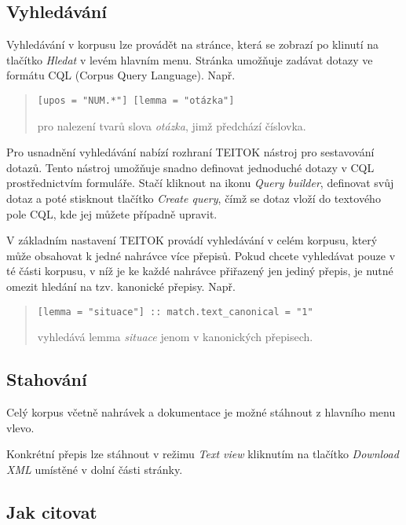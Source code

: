 \documentclass[
]{article}
\begin{document}
\hypertarget{vyhleduxe1vuxe1nuxed}{%
\subsection{Vyhledávání}\label{vyhleduxe1vuxe1nuxed}}

Vyhledávání v korpusu lze provádět na stránce, která se zobrazí po
klinutí na tlačítko \emph{Hledat} v levém hlavním menu. Stránka umožňuje
zadávat dotazy ve formátu CQL (Corpus Query Language). Např.

\begin{quote}
\texttt{{[}upos\ =\ "NUM.*"{]}\ {[}lemma\ =\ "otázka"{]}}

pro nalezení tvarů slova \emph{otázka}, jimž předchází číslovka.
\end{quote}

Pro usnadnění vyhledávání nabízí rozhraní TEITOK nástroj pro sestavování
dotazů. Tento nástroj umožňuje snadno definovat jednoduché dotazy v CQL
prostřednictvím formuláře. Stačí kliknout na ikonu \emph{Query builder},
definovat svůj dotaz a poté stisknout tlačítko \emph{Create query}, čímž
se dotaz vloží do textového pole CQL, kde jej můžete případně upravit.

V základním nastavení TEITOK provádí vyhledávání v celém korpusu, který
může obsahovat k jedné nahrávce více přepisů. Pokud chcete vyhledávat
pouze v té části korpusu, v níž je ke každé nahrávce přiřazený jen
jediný přepis, je nutné omezit hledání na tzv. kanonické přepisy. Např.

\begin{quote}
\texttt{{[}lemma\ =\ "situace"{]}\ ::\ match.text\_canonical\ =\ "1"}

vyhledává lemma \emph{situace} jenom v kanonických přepisech.
\end{quote}

\hypertarget{stahovuxe1nuxed}{%
\subsection{Stahování}\label{stahovuxe1nuxed}}

Celý korpus včetně nahrávek a dokumentace je možné stáhnout z hlavního
menu vlevo.

Konkrétní přepis lze stáhnout v režimu \emph{Text view} kliknutím na
tlačítko \emph{Download XML} umístěné v dolní části stránky.

\hypertarget{jak-citovat}{%
\subsection{Jak citovat}\label{jak-citovat}}
\end{document}
